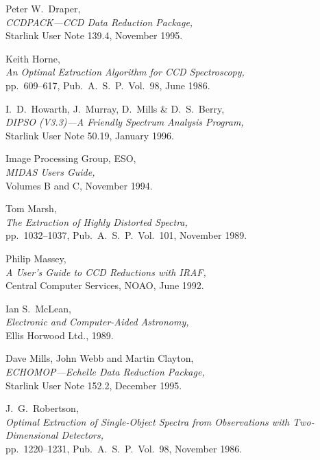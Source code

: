 \documentclass[twoside,11pt]{article}
\newcommand{\htmladdnormallink}[2]{#1}
\newcommand{\xref}[3]{#1}
\newcommand{\scspec}[2]{#1}
\newcommand{\scspec}[2]{#2}
\begin{document}
\begin{thebibliography}{999}
 Peter W.~Draper,\\
      {\sl \xref{CCDPACK\scspec{---}{ - }CCD Data Reduction Package}
      {sun139}{},}\\
      Starlink User Note 139.4, November 1995.

 Keith Horne,\\
      {\sl An Optimal Extraction Algorithm for CCD Spectroscopy,}\\
      pp.~609\scspec{--}{-}617, Pub.~A.~S.~P.~Vol.~98, June 1986.

 I.~D.~Howarth, J.~Murray, D.~Mills \& D.~S.~Berry,\\
      {\sl \xref{DIPSO (V3.3)\scspec{---}{ - }A Friendly Spectrum
      Analysis Program}{sun50}{},}\\
      Starlink User Note 50.19, January 1996.

 Image Processing Group, ESO,\\
      {\sl MIDAS Users Guide,}\\
      Volumes B and C, November 1994.

 Tom Marsh,\\
      {\sl The Extraction of Highly Distorted Spectra,}\\
      pp.~1032\scspec{--}{-}1037, Pub.~A.~S.~P.~Vol.~101, November 1989.

 Philip Massey,\\
      {\sl
      \htmladdnormallink{A User's Guide to CCD Reductions with IRAF}
      {ftp://starlink-ftp.rl.ac.uk/pub/iraf/iraf/docs/ccduser2.ps.Z},}\\
      Central Computer Services, NOAO, June 1992.

 Ian S.~McLean,\\
      {\sl Electronic and Computer-Aided Astronomy,}\\
      Ellis Horwood Ltd., 1989.

 Dave Mills, John Webb and Martin Clayton,\\
      {\sl \xref{ECHOMOP\scspec{---}{ - }Echelle Data Reduction Package}
      {sun152}{},}\\
      Starlink User Note 152.2, December 1995.

 J.~G.~Robertson,\\
     {\sl Optimal Extraction of Single-Object Spectra from Observations
     with Two-Dimensional Detectors,}\\
     pp.~1220\scspec{--}{-}1231, Pub.~A.~S.~P.~Vol.~98, November 1986.


\end{thebibliography}
\end{document}
